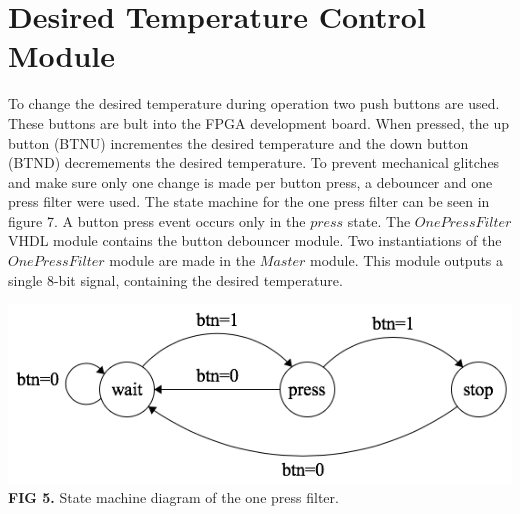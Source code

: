 \documentclass{article}
\begin{document}
\section{Desired Temperature Control Module}
To change the desired temperature during operation two push buttons are used. These buttons are bult into the FPGA development board. When pressed, the up button (BTNU) incrementes the desired temperature and the down button (BTND) decremements the desired temperature. To prevent mechanical glitches and make sure only one change is made per button press, a debouncer and one press filter were used. The state machine for the one press filter can be seen in figure 7. A button press event occurs only in the $press$ state. The $OnePressFilter$ VHDL module contains the button debouncer module. Two instantiations of the $OnePressFilter$ module are made in the $Master$ module. This module outputs a single 8-bit signal, containing the desired temperature.
\begin{center}
\includegraphics[scale=.5]{images/nopressMachine}\\
\textbf{FIG 5.} State machine diagram of the one press filter.\\
\end{center}
\end{document}
